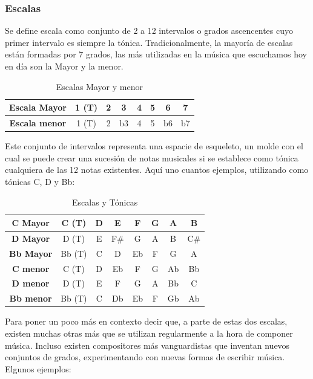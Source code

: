     \subsubsection{Escalas}\label{sec:arm:escalas}

    Se define escala como conjunto de 2 a 12 intervalos o grados ascencentes cuyo primer intervalo es siempre la tónica. Tradicionalmente, la mayoría de escalas están formadas por 7 grados, las más utilizadas en la música que escuchamos hoy en día son la Mayor y la menor.

\begin{table}[h]
    \centering
    \begin{tabular}{c|c|c|c|c|c|c|c}
        \textbf{Escala Mayor} & 1 (T) & 2 & 3 & 4 & 5 & 6 & 7 \\
        \hline
        \hline
        \textbf{Escala menor} & 1 (T) & 2 & b3 & 4 & 5 & b6 & b7 \\
    \end{tabular}
    \caption{Escalas Mayor y menor}
    \label{tab:escalas}
\end{table}

    Este conjunto de intervalos representa una espacie de esqueleto, un molde con el cual se puede crear una sucesión de notas musicales si se establece como tónica cualquiera de las 12 notas existentes. Aquí uno cuantos  ejemplos, utilizando como tónicas C, D y Bb:

\begin{table}[h]
    \centering
    \begin{tabular}{c|c|c|c|c|c|c|c}
        \textbf{C Mayor} & C (T) & D & E & F & G & A & B \\
        \hline
        \textbf{D Mayor} & D (T) & E & F\# & G & A & B & C\# \\
        \hline
        \textbf{Bb Mayor} & Bb (T) & C & D & Eb & F & G & A \\
        \hline
        \hline
        \textbf{C menor} & C (T) & D & Eb & F & G & Ab & Bb \\
        \hline
        \textbf{D menor} & D (T) & E & F & G & A & Bb & C \\
        \hline
        \textbf{Bb menor} & Bb (T) & C & Db & Eb & F & Gb & Ab \\
    \end{tabular}
    \caption{Escalas y Tónicas}
    \label{tab:escalas_tonicas}
\end{table}

    Para poner un poco más en contexto decir que, a parte de estas dos escalas, existen muchas otras más que se utilizan regularmente a la hora de componer música. Incluso existen compositores más vanguardistas que inventan nuevos conjuntos de grados, experimentando con nuevas formas de escribir música. Elgunos ejemplos: 

